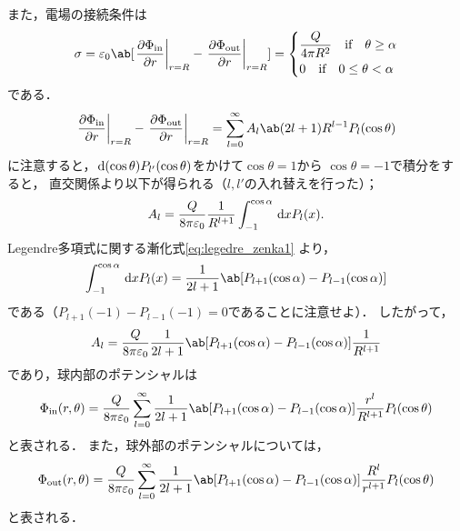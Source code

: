   また，電場の接続条件は
  \begin{gather}%
    \sigma = \eps_0 \ab[\eval{\diffp{\Phi_{\text{in}}}{r}}_{r=R} -
    \eval{\diffp{\Phi_{\text{out}}}{r}}_{r=R}] 
    =
    \begin{dcases}%
      \frac{Q}{4\pi R^2} \qqtext{if} \theta \geq \alpha\\
      0 \qqtext{if} 0 \leq \theta < \alpha
    \end{dcases}%
  \end{gather}%
  である．
  \begin{gather}%
    \eval{\diffp{\Phi_{\text{in}}}{r}}_{r=R}
    - \eval{\diffp{\Phi_{\text{out}}}{r}}_{r=R} 
    = \sum_{l=0}^\infty A_l \ab(2l+1) R^{l-1} P_l(\cos\theta)
  \end{gather}%
  に注意すると，$\dl{(\cos\theta)}P_{l'}(\cos\theta)$をかけて$\cos\theta =1$から
  $\cos\theta = -1$で積分をすると，
  直交関係より以下が得られる（$l,l'$の入れ替えを行った）；
  \begin{gather}%
    A_l = \frac{Q}{8\pi \eps_0}\frac{1}{R^{l+1}} \int_{-1}^{\cos\alpha} \dl{x} P_l(x).
  \end{gather}%
  Legendre多項式に関する漸化式\eqref{eq:legedre_zenka1}
  より，
  \begin{gather}%
    \int_{-1}^{\cos\alpha} \dl{x} P_l(x) 
    = \frac{1}{2l+1}\ab[P_{l+1}(\cos\alpha) - P_{l-1}(\cos\alpha)]
  \end{gather}%
  である（$P_{l+1}(-1) - P_{l-1}(-1) = 0$であることに注意せよ）．
  したがって，
  \begin{gather}%
    A_l = \frac{Q}{8\pi \eps_0} \frac{1}{2l+1} \ab[P_{l+1}(\cos\alpha) - P_{l-1}(\cos\alpha)]\frac{1}{R^{l+1}}
  \end{gather}%
  であり，球内部のポテンシャルは
  \begin{gather}%
    \Phi_{\text{in}}(r,\theta) = \frac{Q}{8\pi \eps_0} \sum_{l=0}^\infty \frac{1}{2l+1}
    \ab[P_{l+1}(\cos\alpha) - P_{l-1}(\cos\alpha)] \frac{r^l}{R^{l+1}} P_l(\cos\theta)
  \end{gather}%
  と表される．
  また，球外部のポテンシャルについては，
  \begin{gather}%
    \Phi_{\text{out}}(r,\theta) = \frac{Q}{8\pi \eps_0} \sum_{l=0}^\infty \frac{1}{2l+1}
    \ab[P_{l+1}(\cos\alpha) - P_{l-1}(\cos\alpha)] \frac{R^l}{r^{l+1}} P_l(\cos\theta)
  \end{gather}%
  と表される．

